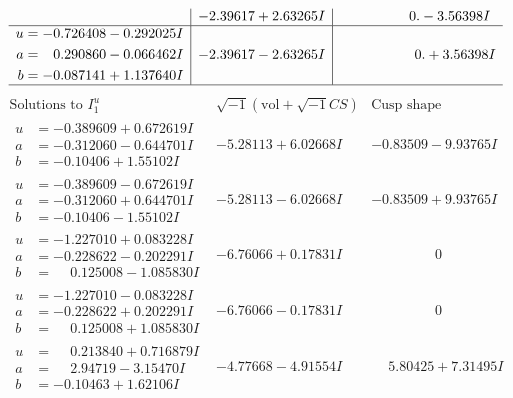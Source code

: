 \documentclass[1p]{elsarticle_modified}
\theoremstyle{definition}
\newcommand{\I}{\sqrt{-1}}
\begin{document}
$$\begin{array}{c|c|c}
 & -2.39617 + 2.63265 I & \phantom{-0.000000 } 0. - 3.56398 I \\ \hline\begin{aligned}
u &= -0.726408 - 0.292025 I \\
a &= \phantom{-}0.290860 - 0.066462 I \\
b &= -0.087141 + 1.137640 I\end{aligned}
 & -2.39617 - 2.63265 I & \phantom{-0.000000 -}0. + 3.56398 I\\
 \hline 
 \end{array}$$\newpage$$\begin{array}{c|c|c}  
\text{Solutions to }I^u_{1}& \I (\text{vol} + \sqrt{-1}CS) & \text{Cusp shape}\\
 \hline 
\begin{aligned}
u &= -0.389609 + 0.672619 I \\
a &= -0.312060 - 0.644701 I \\
b &= -0.10406 + 1.55102 I\end{aligned}
 & -5.28113 + 6.02668 I & -0.83509 - 9.93765 I \\ \hline\begin{aligned}
u &= -0.389609 - 0.672619 I \\
a &= -0.312060 + 0.644701 I \\
b &= -0.10406 - 1.55102 I\end{aligned}
 & -5.28113 - 6.02668 I & -0.83509 + 9.93765 I \\ \hline\begin{aligned}
u &= -1.227010 + 0.083228 I \\
a &= -0.228622 - 0.202291 I \\
b &= \phantom{-}0.125008 - 1.085830 I\end{aligned}
 & -6.76066 + 0.17831 I & \phantom{-0.000000 } 0 \\ \hline\begin{aligned}
u &= -1.227010 - 0.083228 I \\
a &= -0.228622 + 0.202291 I \\
b &= \phantom{-}0.125008 + 1.085830 I\end{aligned}
 & -6.76066 - 0.17831 I & \phantom{-0.000000 } 0 \\ \hline\begin{aligned}
u &= \phantom{-}0.213840 + 0.716879 I \\
a &= \phantom{-}2.94719 - 3.15470 I \\
b &= -0.10463 + 1.62106 I\end{aligned}
 & -4.77668 - 4.91554 I & \phantom{-}5.80425 + 7.31495 I \\ \hline\begin{aligned}

\end{aligned}
\end{array}$$
\end{document}
